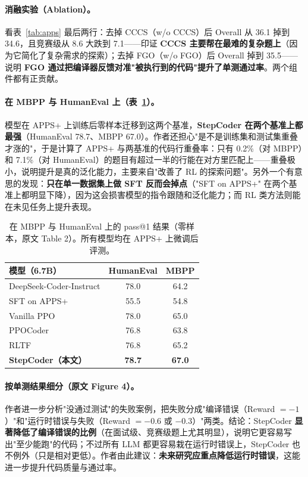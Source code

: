 \documentclass[11pt,UTF8,fontset=fandol]{ctexart}
\begin{document}
\paragraph{消融实验（Ablation）。} 看表~\ref{tab:apps} 最后两行：去掉 CCCS（w/o CCCS）后 Overall 从 36.1 掉到 34.6，且竞赛级从 8.6 大跌到 7.1——印证 \textbf{CCCS 主要帮在最难的复杂题上}（因为它简化了复杂需求的探索）；去掉 FGO（w/o FGO）后 Overall 掉到 35.5——说明 \textbf{FGO 通过把编译器反馈对准"被执行到的代码"提升了单测通过率}。两个组件都有正贡献。

\paragraph{在 MBPP 与 HumanEval 上（表~\ref{tab:mbpp}）。} 模型在 APPS+ 上训练后零样本迁移到这两个基准，\textbf{StepCoder 在两个基准上都最强}（HumanEval 78.7、MBPP 67.0）。作者还担心"是不是训练集和测试集重叠才涨的"，于是计算了 APPS+ 与两基准的代码行重叠率：只有 0.2\%（对 MBPP）和 7.1\%（对 HumanEval）的题目有超过一半的行能在对方里匹配上——重叠极小，说明提升是真的泛化能力，主要来自"改善了 RL 的探索问题"。另外一个有意思的发现：\textbf{只在单一数据集上做 SFT 反而会掉点}（"SFT on APPS+" 在两个基准上都明显下降），因为这会损害模型的指令跟随和泛化能力；而 RL 类方法则能在未见任务上提升表现。

\begin{table}[H]\centering\caption{在 MBPP 与 HumanEval 上的 pass@1 结果（零样本，原文 Table 2）。所有模型均在 APPS+ 上微调后评测。}
\label{tab:mbpp}
\small
\begin{tabular}{lcc}
\toprule
模型（6.7B） & HumanEval & MBPP \\
\midrule
DeepSeek-Coder-Instruct & 78.0 & 64.2 \\
SFT on APPS+ & 55.5 & 54.8 \\
Vanilla PPO & 78.0 & 65.0 \\
PPOCoder & 76.8 & 63.8 \\
RLTF & 76.8 & 65.2 \\
\textbf{StepCoder（本文）} & \textbf{78.7} & \textbf{67.0} \\
\bottomrule
\end{tabular}
\end{table}

\paragraph{按单测结果细分（原文 Figure 4）。} 作者进一步分析"没通过测试"的失败案例，把失败分成"编译错误（Reward $=-1$）"和"运行时错误与失败（Reward $=-0.6$ 或 $-0.3$）"两类。结论：StepCoder \textbf{显著降低了编译错误的比例}（在面试级、竞赛级题上尤其明显），说明它更容易写出"至少能跑"的代码；不过所有 LLM 都更容易栽在运行时错误上，StepCoder 也不例外（只是相对更低）。作者由此建议：\textbf{未来研究应重点降低运行时错误}，这能进一步提升代码质量与通过率。
\end{document}
